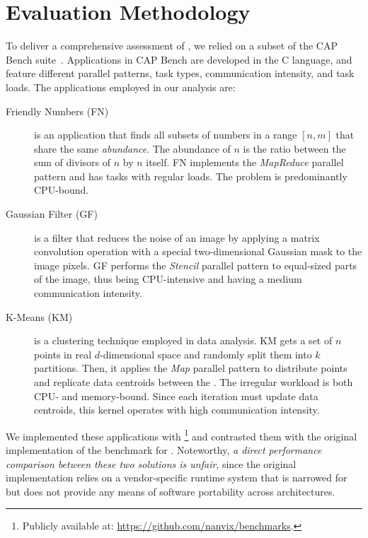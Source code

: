 \section{Evaluation Methodology}
\label{sec:evaluation-methodology}

	To deliver a comprehensive assessment of \lwmpi, we relied on a
	subset of the CAP Bench suite~\cite{Souza2017}.
	Applications in CAP Bench are developed in the C language, and feature
	different parallel patterns, task types, communication intensity, and
	task loads. The applications employed in our analysis are:
	\begin{description}
		\item[Friendly Numbers (FN)] is an application that finds all
			subsets of numbers in a range $[n,m]$ that share the same
			\textit{abundance}. The abundance of $n$ is the ratio
			between the sum of divisors of $n$ by $n$ itself. FN
			implements the \textit{MapReduce} parallel pattern and has
			tasks with regular loads. The problem is predominantly
			CPU-bound.

		\item[Gaussian Filter (GF)] is a filter that reduces the noise
			of an image by applying a matrix convolution operation with
			a special two-dimensional Gaussian mask to the image pixels.
			GF performs the \textit{Stencil} parallel pattern to
			equal-sized parts of the image, thus being CPU-intensive and
			having a medium communication intensity.

		\item[K-Means (KM)] is a clustering technique employed in
			data analysis. KM gets a set of $n$ points in real
			$d$-dimensional space and randomly split them into $k$
			partitions. Then, it applies the \textit{Map} parallel
			pattern to distribute points and replicate data centroids
			between the \cclusters. The irregular workload is both CPU-
			and memory-bound. Since each iteration must update data
			centroids, this kernel operates with high communication
			intensity.
	\end{description}

	We implemented these applications with \mpi\footnote{Publicly
	available at: \url{https://github.com/nanvix/benchmarks}.} and
	contrasted them with the original implementation of the benchmark for
	\mppa. Noteworthy, \textit{a direct performance comparison between these two
	solutions is unfair}, since the original implementation relies on
	a vendor-specific runtime system that is narrowed for
	\mppa but does not provide any means of software portability across
	architectures.

